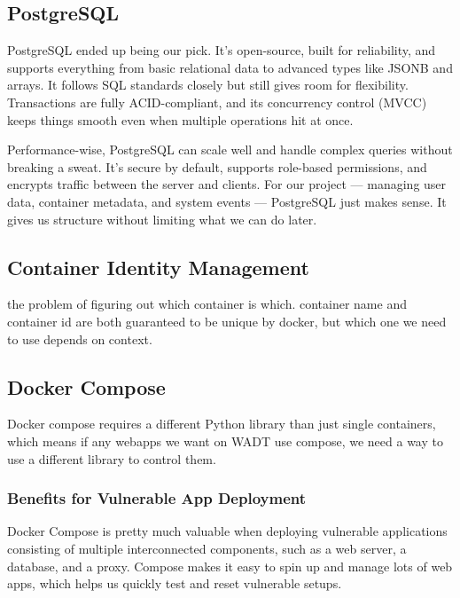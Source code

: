 \documentclass[12pt]{article}
\begin{document}
\subsection{PostgreSQL}
PostgreSQL ended up being our pick. It’s open-source, built for reliability, and supports everything from basic relational data to advanced types like JSONB and arrays. It follows SQL standards closely but still gives room for flexibility. Transactions are fully ACID-compliant, and its concurrency control (MVCC) keeps things smooth even when multiple operations hit at once.

Performance-wise, PostgreSQL can scale well and handle complex queries without breaking a sweat. It’s secure by default, supports role-based permissions, and encrypts traffic between the server and clients. For our project — managing user data, container metadata, and system events — PostgreSQL just makes sense. It gives us structure without limiting what we can do later.


\subsection{Container Identity Management} \label{subsec:container-identity-management}
the problem of figuring out which container is which. container name and container id are both guaranteed to be unique by docker, but which one we need to use depends on context.

\subsection{Docker Compose}
Docker compose requires a different Python library than just
single containers, which means if any webapps we want on WADT
use compose, we need a way to use a different library to control them.

\subsubsection{Benefits for Vulnerable App Deployment}

Docker Compose is pretty much valuable when deploying vulnerable applications consisting of multiple interconnected components, such as a web server, a database, and a proxy. Compose makes it easy to spin up and manage lots of web apps, which helps us quickly test and reset vulnerable setups.
\end{document}
